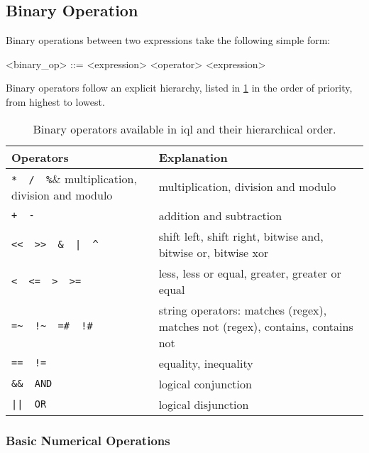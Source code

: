 \documentclass[11pt,a4paper]{report}
\begin{document}
\subsection{Binary Operation}
\label{sec:binary-operation}

Binary operations between two expressions take the following simple form:

\begin{gram}
	\label{gram:binary-operations}
	\begin{grammar}	
		<binary_op> ::= <expression> <operator> <expression>
	\end{grammar}
\end{gram}

\noindent Binary operators follow an explicit hierarchy, listed in \cref{tab:binary-operators} in the order of priority, from highest to lowest.

\begin{table}[ht]
	\centering
	\begin{tabular}{|p{}|p{}|}
		\hline 
		\textbf{Operators}	& \textbf{Explanation} \\ 
		\hline 
		\hline
		\verb|*  /  %|& multiplication, division and modulo \\ 
		\hline 
		\verb|+  -|& addition and subtraction \\ 
		\hline 
		\verb#<<  >>  &  |  ^#& shift left, shift right, bitwise and, bitwise or, bitwise xor \\ 
		\hline 
		\verb|<  <=  >  >=|& less, less or equal, greater, greater or equal \\ 
		\hline 
		\verb|=~  !~  =#  !#|& string operators: matches (regex), matches not (regex), contains, contains not \\ 
		\hline 
		\verb|==  !=|& equality, inequality \\ 
		\hline 
		\verb|&&  AND|& logical conjunction \\ 
		\hline 
		\verb#||  OR#& logical disjunction \\ 
		\hline 
	\end{tabular} 
	\caption[Binary operators]{Binary operators available in \ac{iql} and their hierarchical order.}
	\label{tab:binary-operators}
\end{table}

\subsubsection{Basic Numerical Operations}
\label{sec:basic-numerical-operations}
\end{document}
